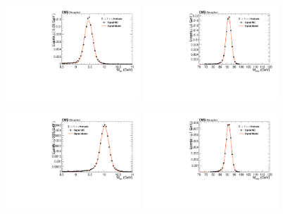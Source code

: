 \begin{figure}[!htbp]
\begin{center}


\includegraphics[width=0.45\textwidth]{figures_and_tables/fitPlotFiles2D/ZToUpsilonPhotonSignalAndBackgroundFit/mMuMNU_ZToUpsilon1SPhotonSignalAndBackgroundFit_Signal_Cat3}\hspace*{1.cm}
\includegraphics[width=0.45\textwidth]{figures_and_tables/fitPlotFiles2D/ZToUpsilonPhotonSignalAndBackgroundFit/mHZ_ZToUpsilon1SPhotonSignalAndBackgroundFit_Signal_Cat3_default}\hspace*{1.cm}

\includegraphics[width=0.45\textwidth]{figures_and_tables/fitPlotFiles2D/ZToUpsilonPhotonSignalAndBackgroundFit/mMuMNU_ZToUpsilon2SPhotonSignalAndBackgroundFit_Signal_Cat3}\hspace*{1.cm}
\includegraphics[width=0.45\textwidth]{figures_and_tables/fitPlotFiles2D/ZToUpsilonPhotonSignalAndBackgroundFit/mHZ_ZToUpsilon2SPhotonSignalAndBackgroundFit_Signal_Cat3_default}\hspace*{1.cm}


\end{center}
\end{figure}
